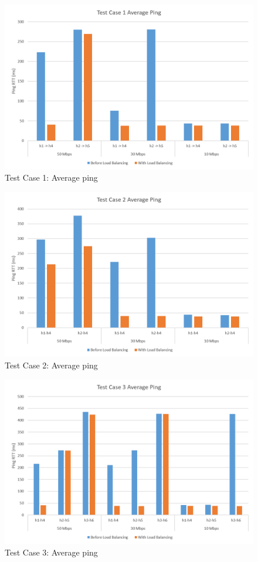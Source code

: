 \begin{figure}[h!]
 \includegraphics[width=\linewidth]{images/test1chart.png}
 \caption{Test Case 1: Average ping}
 \label{fig:test1chart}
\end{figure}

\begin{figure}[h!]
 \includegraphics[width=\linewidth]{images/test2chart.png}
 \caption{Test Case 2: Average ping}
 \label{fig:test2chart}
\end{figure}

\begin{figure}[h!]
 \includegraphics[width=\linewidth]{images/test3chart.png}
 \caption{Test Case 3: Average ping}
 \label{fig:test3chart}
\end{figure}

